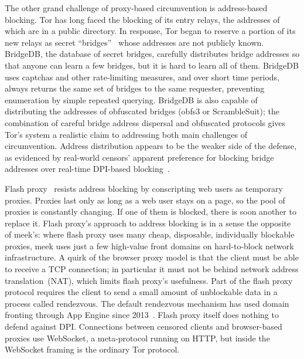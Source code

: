 \documentclass[conference]{IEEEtran}
\begin{document}
The other grand challenge of proxy-based circumvention is address-based blocking.
Tor has long faced the blocking of its entry relays,
the addresses of which are in a public directory.
In response, Tor began to reserve a portion of its
new relays as secret ``bridges''~\cite{tor-blocking}
whose addresses are not publicly known.
BridgeDB, the database of secret bridges,
carefully distributes bridge addresses
so that anyone can learn a few bridges, but it is hard to learn all of them.
BridgeDB uses captchas and other rate-limiting measures,
and over short time periods,
always returns the same set of bridges to the same requester,
preventing enumeration by simple repeated querying.
BridgeDB is also capable of distributing the addresses
of obfuscated bridges (obfs3 or ScrambleSuit);
the combination
of careful bridge address dispersal and obfuscated protocols
gives Tor's system a realistic claim to addressing both main challenges of circumvention.
Address distribution appears to be the weaker side of the defense,
as evidenced by real-world censors' apparent preference for
blocking bridge addresses over real-time DPI-based blocking~\cite{foci12-winter}.

Flash proxy~\cite{flashproxy} resists address blocking by
conscripting web users as temporary proxies. Proxies last only as long as a web
user stays on a page, so the pool of proxies is constantly changing.
If one of them is blocked, there is soon another to replace it.
Flash proxy's approach to address blocking is in a sense
the opposite of meek's:
where flash proxy uses many cheap, disposable, individually blockable proxies,
meek uses just a few high-value front domains on hard-to-block network infrastructure.
A quirk of the browser proxy model is that
the client must be able to receive a TCP connection; in particular it
must not be behind network address translation~(NAT), which limits flash proxy's usefulness.
Part of the flash proxy protocol requires the client to send
a small amount of unblockable data in a process called rendezvous.
The default rendezvous mechanism has used domain fronting through App Engine since 2013~\cite{flashproxy-reg-appspot}.
Flash proxy itself does nothing to defend against DPI.
Connections between censored clients and browser-based proxies use
WebSocket, a meta-protocol running on HTTP,
but inside the WebSocket framing is the ordinary Tor protocol.
\end{document}
